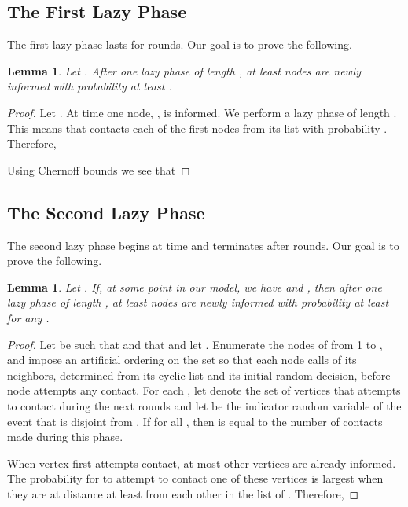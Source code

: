 \documentclass[12pt]{article}
\newtheorem{lemma}[theorem]{Lemma}
\begin{document}
{\subsection{The First Lazy Phase}

The first lazy phase lasts for  rounds. 
Our goal is to prove the following.

\begin{lemma}\label{LazyPhase1}
Let . After one lazy phase of length , at least  nodes are newly informed with probability at least .
\end{lemma}
\begin{proof}
Let . At time  one node, , is informed. We perform a lazy phase of length . This means that  contacts each of the first  nodes from its list with probability . Therefore, 
 

Using Chernoff bounds we see that


\end{proof}



\subsection{The Second Lazy Phase}

The second lazy phase begins at time  and terminates after  rounds.
Our goal is to prove the following.

\begin{lemma}\label{LazyPhase2}
Let . If, at some point  in our model, we have  and , then after one lazy phase of length , at least  nodes are newly informed with probability at least  for any .
\end{lemma}
\begin{proof}
Let  be such that  and that  and let . Enumerate the nodes of  from 1 to , and impose an artificial ordering on the set so that each node  calls  of its neighbors, determined from its cyclic list and its initial random decision, before node  attempts any contact.
For each , let  denote the set of vertices that  attempts to contact during the next  rounds and let  be the indicator random variable of the event that  is disjoint from .
If  for all , then  is equal to the number of contacts made during this phase. 

When vertex  first attempts contact, at most  other vertices are already informed. The probability for  to attempt to contact one of these vertices is largest when they are at distance at least  from each other in the list of . Therefore, 


\end{proof}}
\end{document}
